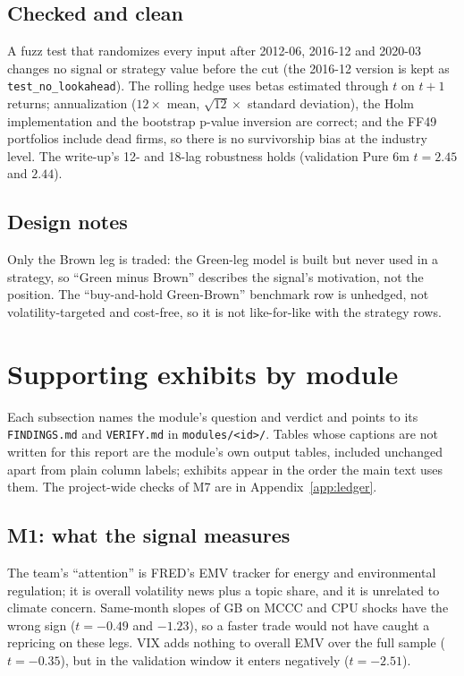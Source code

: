 \subsection{Checked and clean}
A fuzz test that randomizes every input after 2012-06, 2016-12 and 2020-03 changes no signal or strategy value before the cut (the 2016-12 version is kept as \texttt{test\_no\_lookahead}). The rolling hedge uses betas estimated through $t$ on $t+1$ returns; annualization ($12\times$ mean, $\sqrt{12}\times$ standard deviation), the Holm implementation and the bootstrap p-value inversion are correct; and the FF49 portfolios include dead firms, so there is no survivorship bias at the industry level. The write-up's 12- and 18-lag robustness holds (validation Pure 6m $t=2.45$ and $2.44$).

\subsection{Design notes}
Only the Brown leg is traded: the Green-leg model is built but never used in a strategy, so ``Green minus Brown'' describes the signal's motivation, not the position. The ``buy-and-hold Green-Brown'' benchmark row is unhedged, not volatility-targeted and cost-free, so it is not like-for-like with the strategy rows.

\clearpage
\section{Supporting exhibits by module}
\label{app:modules}

Each subsection names the module's question and verdict and points to its \texttt{FINDINGS.md} and \texttt{VERIFY.md} in \texttt{modules/<id>/}. Tables whose captions are not written for this report are the module's own output tables, included unchanged apart from plain column labels; exhibits appear in the order the main text uses them. The project-wide checks of M7 are in Appendix~\ref{app:ledger}.

\subsection{M1: what the signal measures}
\label{app:m1}
The team's ``attention'' is FRED's EMV tracker for energy and environmental regulation; it is overall volatility news plus a topic share, and it is unrelated to climate concern. Same-month slopes of GB on MCCC and CPU shocks have the wrong sign ($t=-0.49$ and $-1.23$), so a faster trade would not have caught a \citet{pst2022} repricing on these legs. VIX adds nothing to overall EMV over the full sample ($t=-0.35$), but in the validation window it enters negatively ($t=-2.51$).

